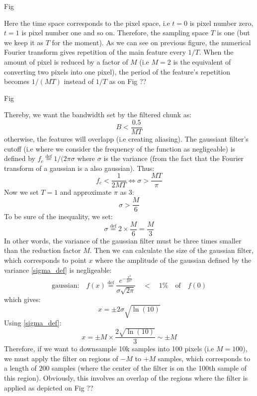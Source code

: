 \documentclass[12pt]{report}
\begin{document}
Fig

Here the time space corresponds to the pixel space, i.e $t=0$ is pixel number zero, $t=1$ is pixel number one and so on. Therefore, the sampling space $T$ is one (but we keep it as $T$ for the moment). As we can see on previous figure, the numerical Fourier transform gives repetition of the main feature every $1/T$. When the amount of pixel is reduced by a factor of $M$ (i.e $M=2$ is the equivalent of converting two pixels into one pixel), the period of the feature's repetition becomes $1/(MT)$ instead of $1/T$ as on Fig ??

Fig

Thereby, we want the bandwidth set by the filtered chunk as:
\begin{equation}
B < \frac{0.5}{MT}
\end{equation}
otherwise, the features will overlapp (i.e creating aliasing). The gaussiant filter's cutoff (i.e where we consider the frequency of the function as negligeable) is defined by $f_c \stackrel{\text{def}}{=} 1/(2\pi \sigma$ where $\sigma$ is the variance (from the fact that the Fourier transform of a gaussian is a also gaussian). Thus:
\begin{equation}
f_c < \frac{1}{2MT} \Leftrightarrow \sigma > \frac{MT}{\pi}
\end{equation}
Now we set $T=1$ and approximate $\pi$ as 3:
\begin{equation}
\sigma > \frac{M}{6}
\end{equation}
To be sure of the inequality, we set:
\begin{equation}
\label{sigma_def}
\sigma \stackrel{\text{def}}{=} 2\times\frac{M}{6} = \frac{M}{3}
\end{equation}
In other words, the variance of the gaussian filter must be three times smaller than the reduction factor $M$. Then we can calculate the size of the gaussian filter, which corresponds to point $x$ where the amplitude of the gaussian defined by the variance \eqref{sigma_def} is negligeable:
\begin{equation}
\textrm{gaussian:} \quad f(x) \stackrel{\text{def}}{=} \frac{e^{-\frac{x^2}{2\sigma^2}}}{\sigma\sqrt{2\pi}} \quad < \quad 1\% \quad \textrm{of} \quad f(0)
\end{equation}
which gives:
\begin{equation}
x = \pm 2\sigma\sqrt{\ln(10)}
\end{equation}
Using \eqref{sigma_def}:
\begin{equation}
x = \pm M \times \frac{2\sqrt{\ln(10)}}{3} \sim \pm M
\end{equation}
Therefore, if we want to downsample 10k samples into 100 pixels (i.e $M = 100$), we must apply the filter on regions of $-M$ to $+M$ samples, which corresponds to a length of $200$ samples (where the center of the filter is on the 100th sample of this region). Obviously, this involves an overlap of the regions where the filter is applied as depicted on Fig ??
\end{document}
